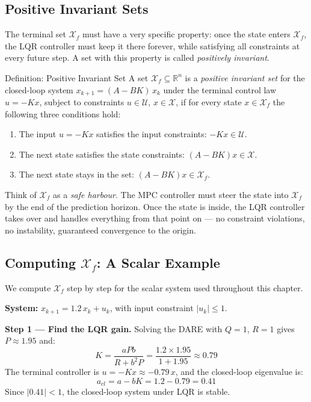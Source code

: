 \subsection{Positive Invariant Sets}

The terminal set $\mathcal{X}_f$ must have a very specific property: once the state enters $\mathcal{X}_f$, the LQR controller must keep it there forever, while satisfying all constraints at every future step. A set with this property is called \emph{positively invariant}.

\begin{defnbox}{Definition: Positive Invariant Set}
	A set $\mathcal{X}_f \subseteq \mathbb{R}^n$ is a \emph{positive invariant set} for the closed-loop system $x_{k+1} = (A - BK)\,x_k$ under the terminal control law $u = -Kx$, subject to constraints $u \in \mathcal{U}$, $x \in \mathcal{X}$, if for every state $x \in \mathcal{X}_f$ the following three conditions hold:
	\begin{enumerate}[noitemsep]
		\item The input $u = -Kx$ satisfies the input constraints: $-Kx \in \mathcal{U}$.
		\item The next state satisfies the state constraints: $(A - BK)x \in \mathcal{X}$.
		\item The next state stays in the set: $(A - BK)x \in \mathcal{X}_f$.
	\end{enumerate}
\end{defnbox}

Think of $\mathcal{X}_f$ as a \textit{safe harbour}. The MPC controller must steer the state into $\mathcal{X}_f$ by the end of the prediction horizon. Once the state is inside, the LQR controller takes over and handles everything from that point on --- no constraint violations, no instability, guaranteed convergence to the origin.

\subsection{Computing $\mathcal{X}_f$: A Scalar Example}
\label{subsec:terminal_set_scalar}

We compute $\mathcal{X}_f$ step by step for the scalar system used throughout this chapter.

\textbf{System:} $x_{k+1} = 1.2\,x_k + u_k$, with input constraint $|u_k| \le 1$.

\textbf{Step 1 --- Find the LQR gain.}
Solving the DARE with $Q = 1$, $R = 1$ gives $P \approx 1.95$ and:
\[
K = \frac{a P b}{R + b^2 P} = \frac{1.2 \times 1.95}{1 + 1.95} \approx 0.79
\]
The terminal controller is $u = -Kx \approx -0.79\,x$, and the closed-loop eigenvalue is:
\[
a_{cl} = a - bK = 1.2 - 0.79 = 0.41
\]
Since $|0.41| < 1$, the closed-loop system under LQR is stable.

